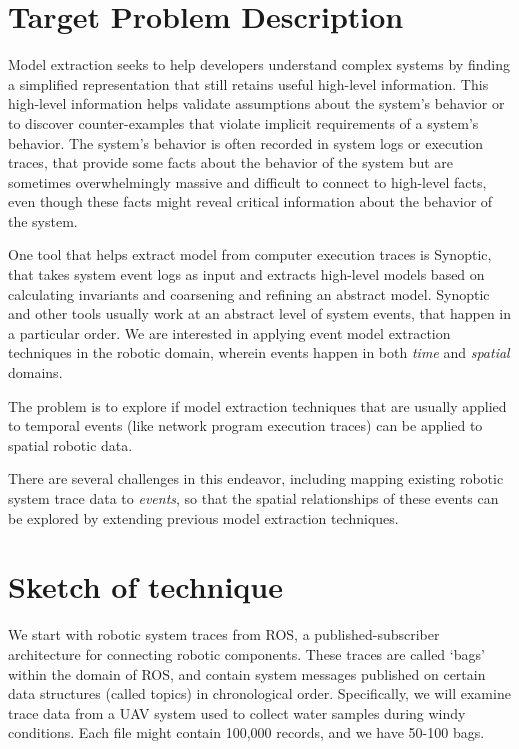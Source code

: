 \documentclass{article}
\begin{document}
\section{Target Problem Description}
\cite{schneider2010synoptic}



Model extraction seeks to help developers understand complex systems by finding a simplified representation that still retains useful high-level information.
This high-level information helps validate assumptions about the system's behavior or to discover counter-examples that violate implicit requirements of a system's behavior.
The system's behavior is often recorded in system logs or execution traces, that provide some facts about the behavior of the system but are sometimes overwhelmingly massive and difficult to connect to high-level facts, even though these facts might reveal critical information about the behavior of the system.

One tool that helps extract model from computer execution traces is Synoptic, that takes system event logs as input and extracts high-level models based on calculating invariants and coarsening and refining an abstract model.
Synoptic and other tools usually work at an abstract level of system events, that happen in a particular order.
We are interested in applying event model extraction techniques in the robotic domain, wherein events happen in both \emph{time} and \emph{spatial} domains.

The problem is to explore if model extraction techniques that are usually applied to temporal events (like network program execution traces) can be applied to spatial robotic data.

There are several challenges in this endeavor, including mapping existing robotic system trace data to \emph{events}, so that the spatial relationships of these events can be explored by extending previous model extraction techniques. 

\section{Sketch of technique}

We start with robotic system traces from ROS, a published-subscriber architecture for connecting robotic components.  
These traces are called `bags' within the domain of ROS, and contain system messages published on certain data structures (called topics) in chronological order.
Specifically, we will examine trace data from a UAV system used to collect water samples during windy conditions.
Each file might contain 100,000 records, and we have 50-100 bags.
\end{document}
